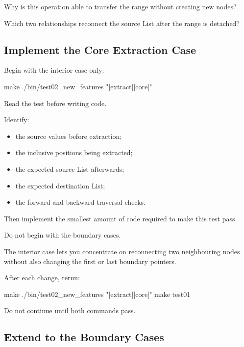 \documentclass{csc2059practical}
\begin{document}
\begin{reflectionbox}
Why is this operation able to transfer the range without creating new nodes?

Which two relationships reconnect the source List after the range is detached?
\end{reflectionbox}


\subsection{Implement the Core Extraction Case}

Begin with the interior case only:

\begin{terminal}
make
./bin/test02_new_features "[extract][core]"
\end{terminal}

Read the test before writing code.

Identify:

\begin{itemize}
    \item the source values before extraction;
    \item the inclusive positions being extracted;
    \item the expected source List afterwards;
    \item the expected destination List;
    \item the forward and backward traversal checks.
\end{itemize}

Then implement the smallest amount of code required to make this test pass.

\begin{importantnote}
Do not begin with the boundary cases.

The interior case lets you concentrate on reconnecting two neighbouring nodes without also changing the first or last boundary pointers.
\end{importantnote}

After each change, rerun:

\begin{terminal}
make
./bin/test02_new_features "[extract][core]"
make test01
\end{terminal}

Do not continue until both commands pass.


\subsection{Extend to the Boundary Cases}
\end{document}
